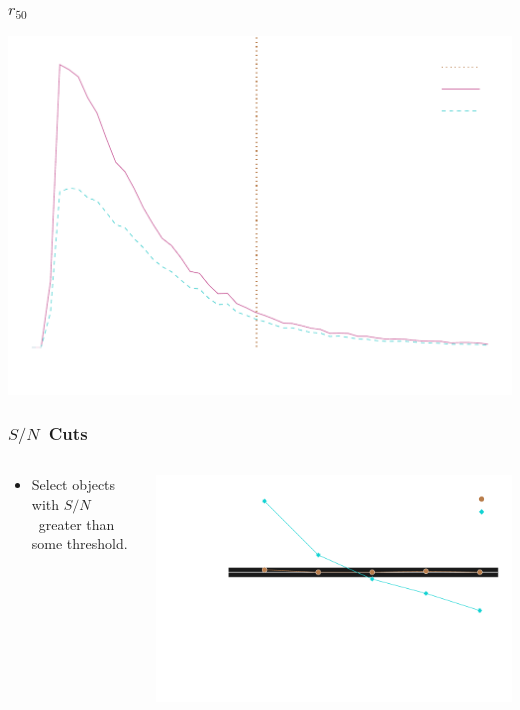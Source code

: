 \documentclass{beamer}
\newcommand{\snr}{$S/N$}
\begin{document}
\frame
{
    \frametitle{$r_{50}$}
 
    \begin{center}
        \includegraphics[width=\textwidth]{run-bdj03mcal01-r50-inv.pdf}
        \newline
    \end{center}



}



\frame
{
    \frametitle{\snr\ Cuts}
 

    \begin{columns}
        \begin{column}{0.4\textwidth}
            \begin{itemize}
                \item Select objects with \snr\ greater than some threshold.
            \end{itemize}
        \end{column}
        \begin{column}{0.6\textwidth}
            \begin{center}
            \includegraphics[width=\textwidth]{mc-select-bias-thresh-with-nocorr-inv.pdf}
                \newline
            \end{center}
        \end{column}
    \end{columns}


}
\end{document}
